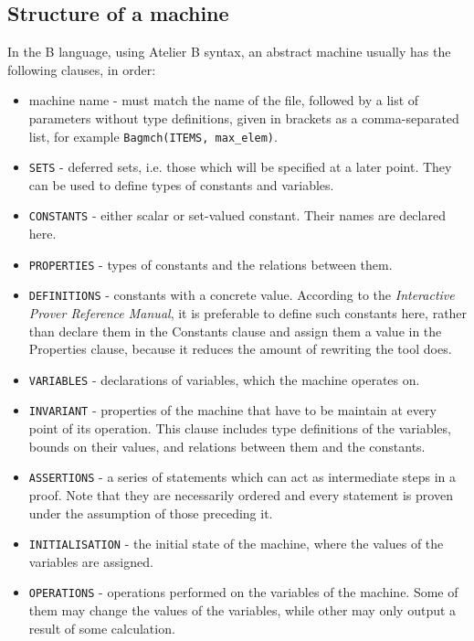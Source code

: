 \documentclass[11pt,journal]{IEEEtran}
\begin{document}
	\subsection{Structure of a machine}
	In the B language, using Atelier B syntax, an abstract machine usually has the following clauses, in order:
	\begin{itemize}
		\item machine name - must match the name of the file, followed by a list of parameters without type definitions, given in brackets as a comma-separated list, for example \texttt{Bagmch(ITEMS, max\_elem)}.
		\item \texttt{SETS} - deferred sets, i.e. those which will be specified at a later point. They can be used to define types of constants and variables.
		\item \texttt{CONSTANTS} - either scalar or set-valued constant. Their names are declared here.
		\item \texttt{PROPERTIES} - types of constants and the relations between them. 
		\item \texttt{DEFINITIONS} - constants with a concrete value. According to the \emph{Interactive Prover Reference Manual}, it is preferable to define such constants here, rather than declare them in the Constants clause and assign them a value in the Properties clause, because it reduces the amount of rewriting the tool does.\cite{Prover guide} 
		\item \texttt{VARIABLES} - declarations of variables, which the machine operates on.
		\item \texttt{INVARIANT} - properties of the machine that have to be maintain at every point of its operation. This clause includes type definitions of the variables, bounds on their values, and relations between them and the constants.
		\item \texttt{ASSERTIONS} - a series of statements which can act as intermediate steps in a proof. Note that they are necessarily ordered and every statement is proven under the assumption of those preceding it.
		\item \texttt{INITIALISATION} - the initial state of the machine, where the values of the variables are assigned.
		\item \texttt{OPERATIONS} - operations performed on the variables of the machine. Some of them may change the values of the variables, while other may only output a result of some calculation.
	\end{itemize}
\end{document}
